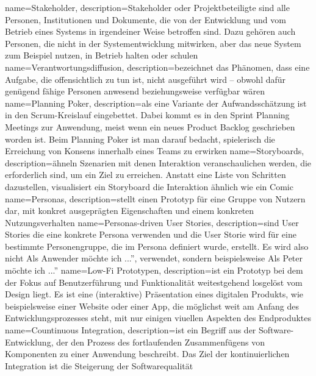 {
name=Stakeholder,
description={Stakeholder oder Projektbeteiligte sind alle Personen, Institutionen und Dokumente, die von der Entwicklung und vom Betrieb eines Systems in irgendeiner Weise betroffen sind. Dazu gehören auch Personen, die nicht in der Systementwicklung mitwirken, aber das neue System zum Beispiel nutzen, in Betrieb halten oder schulen}
}
{
	name=Verantwortungsdiffusion,
	description={bezeichnet das Phänomen, dass eine Aufgabe, die offensichtlich zu tun ist, nicht ausgeführt wird – obwohl dafür genügend fähige Personen anwesend beziehungsweise verfügbar wären}
}
{
	name=Planning Poker,
	description={als eine Variante der Aufwandsschätzung ist in den Scrum-Kreis\-lauf eingebettet. Dabei kommt es in den Sprint Planning Meetings zur Anwendung, meist wenn ein neues Product Backlog geschrieben worden ist. Beim Planning Poker ist man darauf bedacht, spielerisch die Erreichung von Konsens innerhalb eines Teams zu erwirken}
}
{
	name=Storyboards,
	description={ähneln Szenarien mit denen Interaktion veranschaulichen werden, die erforderlich sind, um ein Ziel zu erreichen. Anstatt eine Liste von Schritten dazustellen, visualisiert ein Storyboard die Interaktion ähnlich wie ein Comic}
}
{
name=Personas,
description={stellt einen Prototyp für eine Gruppe von Nutzern dar, mit konkret ausgeprägten Eigenschaften und einem konkreten Nutzungsverhalten}
}
{
	name=Personas-driven User Stories,
	description={sind User Stories die eine konkrete Persona verwenden und die User Storie wird für eine bestimmte Personengruppe, die im Persona definiert wurde, erstellt. Es wird also nicht \glqq Als Anwender möchte ich ...'', verwendet, sondern beispielsweise \glqq Als Peter möchte ich ...''}
}
{
	name=Low-Fi Prototypen,
	description={ist ein Prototyp bei dem der Fokus auf Benutzerführung und Funktionalität weitestgehend losgelöst vom Design liegt.  Es ist eine (interaktive) Präsentation eines digitalen Produkts, wie beispielsweise einer Website oder einer App, die möglichst weit am Anfang des Entwicklungsprozesses steht, mit nur einigen viuellen Aspekten des Endproduktes}
}
{
	name=Countinuous Integration,
	description={ist ein Begriff aus der Software-Entwicklung, der den Prozess des fortlaufenden Zusammenfügens von Komponenten zu einer Anwendung beschreibt. Das Ziel der kontinuierlichen Integration ist die Steigerung der Softwarequalität}
}
